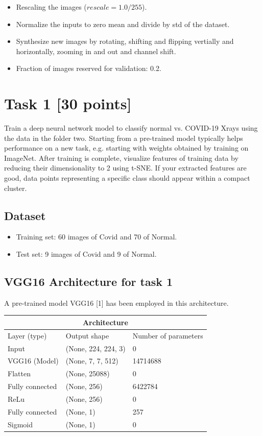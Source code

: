 \documentclass[a4paper,12pt]{article}
\begin{document}
\begin{itemize}
        \item Rescaling the images ($rescale=1.0/255$).
        \item Normalize the inputs to zero mean and divide by std of the dataset.
        \item Synthesize new images by rotating, shifting and flipping vertially and horizontally, zooming in and out and channel shift.
        \item Fraction of images reserved for validation: 0.2.
\end{itemize}

\section{Task 1 [30 points]}
Train a deep neural network model to classify normal vs. COVID-19 Xrays using the data in the folder two. Starting from a pre-trained model typically helps performance on a new task, e.g. starting with weights obtained by training on ImageNet. After training is complete, visualize features of training data by reducing their dimensionality to 2 using t-SNE. If your extracted features are good, data points representing a specific class should appear within a compact cluster. 

\subsection{Dataset}
\begin{itemize}
  \item Training set: 60 images of Covid and 70 of Normal.
  \item Test set: 9 images of Covid and 9 of Normal.
\end{itemize}



\subsection{VGG16 Architecture for task 1}
A pre-trained model VGG16 [1] has been employed in this architecture. \\

\begin{tabular}{ |p{4cm}|p{4cm}|p{4cm}|}
  \hline
  \multicolumn{3}{|c|}{Architecture} \\
  \hline
  Layer (type) & Output shape & Number of parameters \\
  \hline
  Input              & (None, 224, 224, 3)& 0 \\
  VGG16 (Model)      & (None, 7, 7, 512)  & 14714688 \\
  Flatten            & (None, 25088)      & 0   \\
  Fully connected    & (None, 256)        & 6422784 \\
  ReLu               & (None, 256)        & 0 \\
  Fully connected    & (None, 1)          & 257\\
  Sigmoid            & (None, 1)          & 0 \\
  \hline
\end{tabular}
\end{document}
